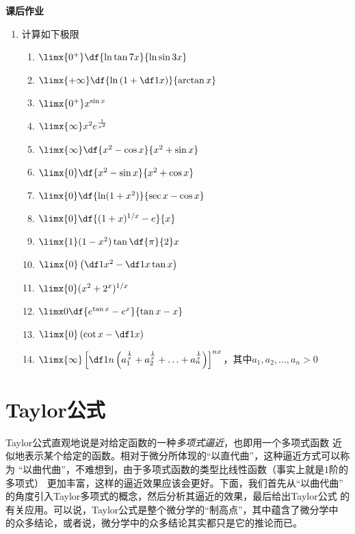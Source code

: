 \begin{ext}
	{\bf 课后作业}
	
	\begin{enumerate}
	  \item 计算如下极限
		\begin{enumerate}[(1)]
		  \item $\limx{0^+}\df{\ln\tan 7x}{\ln\sin 3x}$
		  \item $\limx{+\infty}\df{\ln\left(1+\df1x\right)}{\arctan x}$
		  \item $\limx{0^+}x^{\sin x}$
		  \item $\limx{\infty}x^2e^{\frac1{x^2}}$
		  \item $\limx{\infty}\df{x^2-\cos x}{x^2+\sin x}$
		  \item $\limx{0}\df{x^2-\sin x}{x^2+\cos x}$
		  \item $\limx{0}\df{\ln(1+x^2)}{\sec x-\cos x}$
  		  \item $\limx{0}\df{(1+x)^{1/x}-e}{x}$ 
   		  \item $\limx{1}(1-x^2)\tan\df{\pi}{2}x$ 
  		  \item $\limx{0}\left(\df 1{x^2}-\df 1{x\tan x}\right)$ 
  		  \item $\limx{0}(x^2+2^x)^{1/x}$ 
  		  \item $\limx0\df{e^{\tan x}-e^x}{\tan x-x}$
  		  \item $\limx{0}\left(\cot x-\df 1x\right)$ 
  		  \item $\limx{\infty}\left[\df1n\left(a_1^{\frac1x}+a_2^{\frac1x}
  		  +\ldots+a_n^{\frac1x}\right)\right]^{nx}$，其中$a_1,a_2,\ldots,a_n>0$
		\end{enumerate}
	\end{enumerate}
\end{ext}

\section{Taylor公式}

Taylor公式直观地说是对给定函数的一种{\it 多项式逼近}，也即用一个多项式函数
近似地表示某个给定的函数。相对于微分所体现的“以直代曲”，这种逼近方式可以称为
“以曲代曲”，不难想到，由于多项式函数的类型比线性函数（事实上就是$1$阶的多项式）
更加丰富，这样的逼近效果应该会更好。下面，我们首先从“以曲代曲”
的角度引入Taylor多项式的概念，然后分析其逼近的效果，最后给出Taylor公式
的有关应用。可以说，Taylor公式是整个微分学的“制高点”，其中蕴含了微分学中
的众多结论，或者说，微分学中的众多结论其实都只是它的推论而已。

